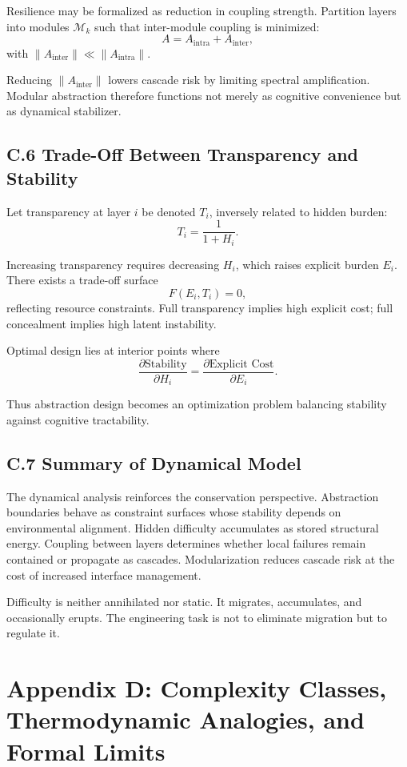 \documentclass[11pt]{article}
\begin{document}
Resilience may be formalized as reduction in coupling strength. Partition layers into modules $\mathcal{M}_k$ such that inter-module coupling is minimized:
\[
A = A_{\text{intra}} + A_{\text{inter}},
\]
with $\|A_{\text{inter}}\| \ll \|A_{\text{intra}}\|$.

Reducing $\|A_{\text{inter}}\|$ lowers cascade risk by limiting spectral amplification. Modular abstraction therefore functions not merely as cognitive convenience but as dynamical stabilizer.

\subsection{C.6 Trade-Off Between Transparency and Stability}

Let transparency at layer $i$ be denoted $T_i$, inversely related to hidden burden:
\[
T_i = \frac{1}{1 + H_i}.
\]

Increasing transparency requires decreasing $H_i$, which raises explicit burden $E_i$. There exists a trade-off surface
\[
F(E_i, T_i) = 0,
\]
reflecting resource constraints. Full transparency implies high explicit cost; full concealment implies high latent instability.

Optimal design lies at interior points where
\[
\frac{\partial \text{Stability}}{\partial H_i} = \frac{\partial \text{Explicit Cost}}{\partial E_i}.
\]

Thus abstraction design becomes an optimization problem balancing stability against cognitive tractability.

\subsection{C.7 Summary of Dynamical Model}

The dynamical analysis reinforces the conservation perspective. Abstraction boundaries behave as constraint surfaces whose stability depends on environmental alignment. Hidden difficulty accumulates as stored structural energy. Coupling between layers determines whether local failures remain contained or propagate as cascades. Modularization reduces cascade risk at the cost of increased interface management.

Difficulty is neither annihilated nor static. It migrates, accumulates, and occasionally erupts. The engineering task is not to eliminate migration but to regulate it.


\section{Appendix D: Complexity Classes, Thermodynamic Analogies, and Formal Limits}
\end{document}
